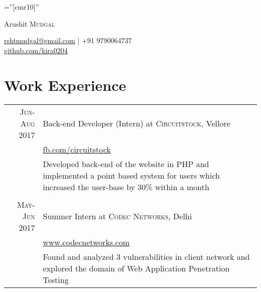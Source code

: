 \documentclass[a4paper,1pt]{article}
\begin{document}

\pagestyle{empty} %

\font\fb=''[cmr10]'' %

\par{\centering
		{\Huge Arushit \textsc{Mudgal}
		
	}\href{mailto:rshtmudgal@gmail.com}{rshtmudgal@gmail.com} | +91 9790064737\\
	\href{http://github.com/kira0204}{github.com/kira0204}\bigskip\par}

%

\section{Work Experience}
\begin{tabular}{r|p{11cm}}

 \textsc{Jun-Aug 2017} & Back-end Developer (Intern) at \textsc{Circuitstock}, Vellore \\&\href{https://www.facebook.com/circuitstock/}{fb.com/circuitstock}\\&\footnotesize{Developed back-end of the website in PHP and implemented a point based system for users which increased the user-base by 30\% within a month}\\\multicolumn{2}{c}{} \\
\textsc{May-Jun 2017} & Summer Intern at \textsc{Codec Networks}, Delhi \\&\href{https://www.codecnetworks.com}{www.codecnetworks.com}\\&\footnotesize{Found and analyzed 3 vulnerabilities in client network and explored the domain of Web Application Penetration Testing}
\end{tabular}
\end{document}

